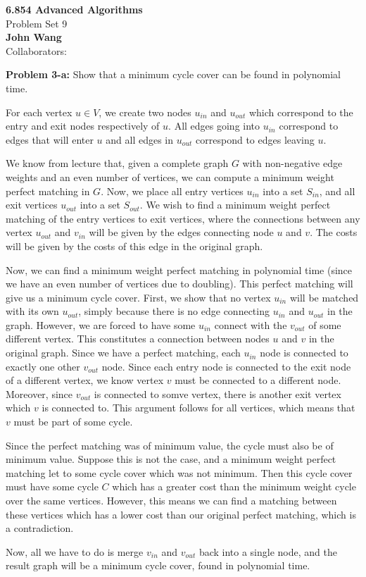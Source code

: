 \documentclass[psamsfonts]{amsart}
\newenvironment{sol}{\vspace{0.25cm}{\large \bfseries Solution:}}{\qedsymbol}
\newenvironment{prob}[1]{\begin{framed}{\large \bfseries Problem #1:}}{\end{framed}}
\newcommand{\makenewtitle}{
    \begin{center}
    {\huge \bfseries 6.854 Advanced Algorithms} \\
    Problem Set 9\\
    \vspace{0.25cm}
    {\bfseries John Wang} \\
    Collaborators:  
    \end{center}
    \vspace{0.5cm}
}
\begin{document}
\makenewtitle

\begin{prob}{3-a}
Show that a minimum cycle cover can be found in polynomial time.
\end{prob}
\begin{sol}
For each vertex $u \in V$, we create two nodes $u_{in}$ and $u_{out}$ which correspond to the entry and exit nodes respectively of $u$. All edges going into $u_{in}$ correspond to edges that will enter $u$ and all edges in $u_{out}$ correspond to edges leaving $u$.

We know from lecture that, given a complete graph $G$ with non-negative edge weights and an even number of vertices, we can compute a minimum weight perfect matching in $G$. Now, we place all entry vertices $u_{in}$ into a set $S_{in}$, and all exit vertices $u_{out}$ into a set $S_{out}$. We wish to find a minimum weight perfect matching of the entry vertices to exit vertices, where the connections between any vertex $u_{out}$ and $v_{in}$ will be given by the edges connecting node $u$ and $v$. The costs will be given by the costs of this edge in the original graph. 

Now, we can find a minimum weight perfect matching in polynomial time (since we have an even number of vertices due to doubling). This perfect matching will give us a minimum cycle cover. First, we show that no vertex $u_{in}$ will be matched with its own $u_{out}$, simply because there is no edge connecting $u_{in}$ and $u_{out}$ in the graph. However, we are forced to have some $u_{in}$ connect with the $v_{out}$ of some different vertex. This constitutes a connection between nodes $u$ and $v$ in the original graph. Since we have a perfect matching, each $u_{in}$ node is connected to exactly one other $v_{out}$ node. Since each entry node is connected to the exit node of a different vertex, we know vertex $v$ must be connected to a different node. Moreover, since $v_{out}$ is connected to somve vertex, there is another exit vertex which $v$ is connected to. This argument follows for all vertices, which means that $v$ must be part of some cycle. 

Since the perfect matching was of minimum value, the cycle must also be of minimum value. Suppose this is not the case, and a minimum weight perfect matching let to some cycle cover which was not minimum. Then this cycle cover must have some cycle $C$ which has a greater cost than the minimum weight cycle over the same vertices. However, this means we can find a matching between these vertices which has a lower cost than our original perfect matching, which is a contradiction.

Now, all we have to do is merge $v_{in}$ and $v_{out}$ back into a single node, and the result graph will be a minimum cycle cover, found in polynomial time.
\end{sol}
\end{document}
